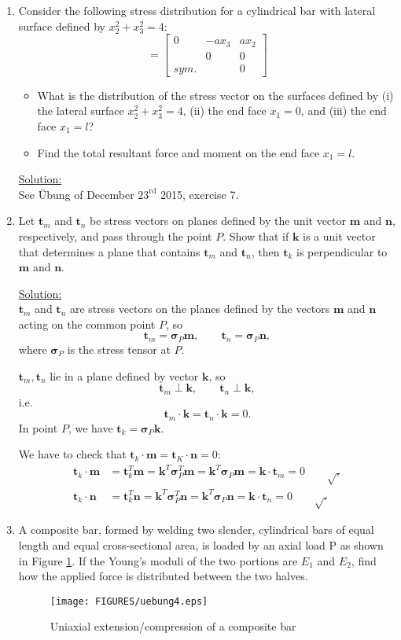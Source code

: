 \documentclass{article}
\newcommand{\ee}{\end{equation}}
\newcommand{\be}{\begin{equation}}
\newcommand{\bi}{\begin{itemize}}
\newcommand{\ei}{\end{itemize}}
\newcommand{\bs}{\boldsymbol}
\begin{document}
\begin{enumerate}
\item Consider the following stress distribution for a cylindrical bar with lateral surface defined by $x_2^2 + x^2_3 = 4$:
\be
[\bs{\sigma}]=\left[\begin{array}{ccc} 0 & -ax_3 & ax_2 \\   & 0 & 0 \\ sym. &  & 0 \end{array} \right]
\ee
\bi
\item What is the distribution of the stress vector on the surfaces defined by (i) the lateral
surface $x_2^2 + x^2_3 = 4$, (ii) the end face $x_1 = 0$, and (iii) the end face $x_1 = l$?
\item Find the total resultant force and moment on the end face $x_1 = l$.
\ei
\underline{Solution:} \\
See \"Ubung of December $23^{\textrm{rd}}$ 2015, exercise 7.

\item  Let $\bs t_m$ and $\bs t_n$ be stress vectors on planes defined by the unit vector $\bs m$ and $\bs n$, respectively,
and pass through the point $P$. Show that if $\bs k$ is a unit vector that determines a plane that
contains $\bs t_m$ and $\bs t_n$, then $\bs t_k$ is perpendicular to $\bs m$ and $\bs n$.

\underline{Solution:} \\ %
$\bs t_m$ and $\bs t_n$ are stress vectors on the planes defined by the vectors $\bs m$ and $\bs n$ acting on the common point $P$, so
\be
\bs t_m = \bs \sigma_P \bs m, \qquad \bs t_n = \bs \sigma_P \bs n,
\ee
where $\bs \sigma_P$ is the stress tensor at $P$.

$\bs t_m, \bs t_n$ lie in a plane defined by vector $\bs k$, so
\be
\bs t_m \perp \bs k, \qquad \bs t_n \perp \bs k,
\ee
i.e.
\be
\bs t_m \cdot \bs k = \bs t_n \cdot \bs k = 0.
\ee
In point $P$, we have $\bs t_k = \bs \sigma_P \bs k$. 

We have to check that $\bs t_k \cdot \bs m = \bs t_K \cdot \bs n = 0$:
\begin{align}
\bs t_k \cdot \bs m &= \bs t_k^T \bs m = \bs k^T \bs \sigma_P^T \bs m = \bs k^T \bs \sigma_P \bs m = \bs k \cdot \bs t_m = 0 \qquad \surd, \\
\bs t_k \cdot \bs n &= \bs t_k^T \bs n = \bs k^T \bs \sigma_P^T \bs n = \bs k^T \bs \sigma_P \bs n = \bs k \cdot \bs t_n = 0 \qquad \surd.
\end{align}


\item  A composite bar, formed by welding two slender, cylindrical bars of equal length and equal cross-sectional area, is
loaded by an axial load P as shown in Figure \ref{fig:543}. If the Young's moduli of the two portions are $E_1$ and $E_2$,  find how the applied force is distributed between the two halves.
\begin{figure}[!h]
\centering
{}
 \texttt{[image: FIGURES/uebung4.eps]}
\caption{Uniaxial extension/compression of a composite bar}
\label{fig:543}
\end{figure}


\end{enumerate}
\end{document}
